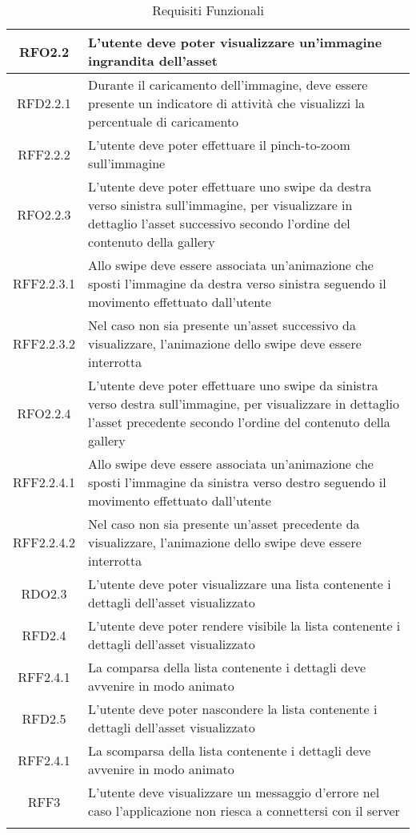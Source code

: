\begin{longtable}{|c|m{10cm}|}
RFO2.2 & L'utente deve poter visualizzare un'immagine ingrandita dell'asset \\ \hline
RFD2.2.1 & Durante il caricamento dell'immagine, deve essere presente un indicatore di attività che visualizzi la percentuale di caricamento \\ \hline
RFF2.2.2 & L'utente deve poter effettuare il pinch-to-zoom sull'immagine \\ \hline
RFO2.2.3 & L'utente deve poter effettuare uno swipe da destra verso sinistra sull'immagine, per visualizzare in dettaglio l'asset successivo secondo l'ordine del contenuto della gallery \\ \hline
RFF2.2.3.1 & Allo swipe deve essere associata un'animazione che sposti l'immagine da destra verso sinistra seguendo il movimento effettuato dall'utente \\ \hline
RFF2.2.3.2 & Nel caso non sia presente un'asset successivo da visualizzare, l'animazione dello swipe deve essere interrotta \\ \hline
RFO2.2.4 & L'utente deve poter effettuare uno swipe da sinistra verso destra sull'immagine, per visualizzare in dettaglio l'asset precedente secondo l'ordine del contenuto della gallery \\ \hline
RFF2.2.4.1 & Allo swipe deve essere associata un'animazione che sposti l'immagine da sinistra verso destro seguendo il movimento effettuato dall'utente \\ \hline
RFF2.2.4.2 & Nel caso non sia presente un'asset precedente da visualizzare, l'animazione dello swipe deve essere interrotta \\ \hline
RDO2.3 & L'utente deve poter visualizzare una lista contenente i dettagli dell'asset visualizzato \\ \hline
RFD2.4 & L'utente deve poter rendere visibile la lista contenente i dettagli dell'asset visualizzato \\ \hline
RFF2.4.1 & La comparsa della lista contenente i dettagli deve avvenire in modo animato \\ \hline
RFD2.5 & L'utente deve poter nascondere la lista contenente i dettagli dell'asset visualizzato \\ \hline
RFF2.4.1 & La scomparsa della lista contenente i dettagli deve avvenire in modo animato \\ \hline
RFF3 & L'utente deve visualizzare un messaggio d'errore nel caso l'applicazione non riesca a connettersi con il server \\ \hline
\caption[Requisiti Funzionali]{Requisiti Funzionali}
\label{tabella:req0}
\end{longtable}
\clearpage
